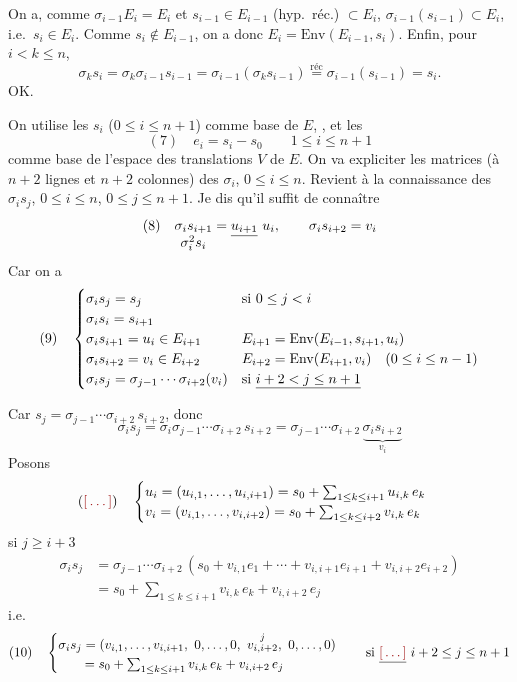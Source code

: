 \documentclass[11pt,a4paper]{article}
\begin{document}
On a, comme $\sigma_{i-1}E_i = E_i$ et $s_{i-1} \in E_{i-1}$ (hyp.\ réc.) $\subset E_i$, $\sigma_{i-1}(s_{i-1}) \subset E_i$, i.e.\ $s_i \in E_i$. Comme $s_i \notin E_{i-1}$, on a donc $E_i = \mathrm{Env}(E_{i-1}, s_i)$. Enfin, pour \struck{\ill{}} $i<k\le n$,
\[
\sigma_k s_i = \sigma_k\sigma_{i-1}s_{i-1} = \sigma_{i-1}(\sigma_k s_{i-1}) \overset{\text{réc}}{=} \sigma_{i-1}(s_{i-1}) = s_i.
\]
OK.

On utilise les $s_i$ ($0\le i\le n+1$) comme base de $E$, \ill{} \ill{} , et les
\[
(7)\quad e_i = s_i - s_0 \qquad 1\le i\le n+1
\]
comme base de l'espace des translations $V$ de $E$. On va expliciter les matrices (à $n+2$ lignes et $n+2$ colonnes) des $\sigma_i$, $0\le i\le n$. Revient à la connaissance des $\sigma_i s_j$, $0\le i\le n$, $0\le j\le n+1$. Je dis qu'il suffit de connaître
\[
(8)\quad \underset{\textstyle \sigma_i^2 s_i}{\sigma_i s_{i+1}} = \struck{u_{i+1}}\ u_i, \qquad \sigma_i s_{i+2} = v_i
\]
Car on a
\[
(9)\quad \begin{cases}
\sigma_i s_j = s_j & \text{si } 0\le j< i\\
\sigma_i s_i = s_{i+1}\\
\sigma_i s_{i+1} = u_i \in E_{i+1} & E_{i+1} = \mathrm{Env}(E_{i-1}, s_{i+1}, u_i)\\
\sigma_i s_{i+2} = v_i \in E_{i+2} & E_{i+2} = \mathrm{Env}(E_{i+1}, v_i) \quad (0\le i\le n-1)\\
\sigma_i s_j = \sigma_{j-1}\cdots\sigma_{i+2}(v_i) & \text{si } \uncertain{i+2< j\le n+1}
\end{cases}
\]

Car $s_j = \sigma_{j-1}\cdots\sigma_{i+2}\,s_{i+2}$, donc
\[
\sigma_i s_j = \sigma_i\sigma_{j-1}\cdots\sigma_{i+2}\,s_{i+2} = \sigma_{j-1}\cdots\sigma_{i+2}\,\underbrace{\sigma_i s_{i+2}}_{v_i}
\]
Posons 
\[
(\ill)\quad \begin{cases}
u_i = (u_{i,1},\dots,u_{i,i+1}) = s_0 + \sum_{1\le k\le i+1} u_{i,k}\,e_k\\
v_i = (v_{i,1},\dots,v_{i,i+2}) = s_0 + \sum_{1\le k\le i+2} v_{i,k}\,e_k
\end{cases}
\]
\ill{} \ill{}  si $j\ge i+3$
\[
\begin{aligned}
\sigma_i s_j &= \sigma_{j-1}\cdots\sigma_{i+2}\,(s_0 + v_{i,1}e_1 + \cdots + v_{i,i+1}e_{i+1} + v_{i,i+2}e_{i+2})\\
&= s_0 + \sum_{1\le k\le i+1} v_{i,k}\,e_k + v_{i,i+2}\,e_j
\end{aligned}
\]
i.e.
\[
(10)\quad \begin{cases}
\sigma_i s_j = (v_{i,1},\dots,v_{i,i+1},\ 0,\dots,0,\ \overset{j}{v_{i,i+2}},\ 0,\dots,0)\\
\qquad = s_0 + \sum_{1\le k\le i+1} v_{i,k}\,e_k + v_{i,i+2}\,e_j
\end{cases}
\quad \text{si } \struck{\ill{}}\ i+2\le j\le n+1
\]
\end{document}
